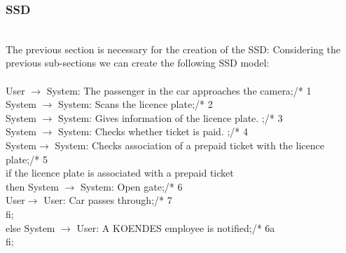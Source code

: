 \subsubsection{SSD}
\creator{\studentB}
\\
The previous section is necessary for the creation of the SSD: Considering the previous sub-sections we can create the following SSD model:\\\\
User $\rightarrow$ System: The passenger in the car approaches the camera;\hfill /* 1\\
System $\rightarrow$ System: Scans the licence plate;\hfill /* 2\\
System $\rightarrow$ System: Gives information of the licence plate.
;\hfill /* 3\\
System $\rightarrow$ System: Checks whether ticket is paid.
;\hfill /* 4\\
System$\rightarrow$ System: Checks association of a prepaid ticket with the licence plate;\hfill /* 5\\
if the licence plate is associated with a prepaid ticket\\
then System $\rightarrow$ System: Open gate;\hfill /* 6\\
\phantom{x}\hspace{2ex}User$\rightarrow$ User: Car passes through;\hfill /* 7\\
\phantom{x}\hspace{2ex}fi;\\
else System $\rightarrow$ User: A KOENDES employee is notified;\hfill /* 6a\\
fi;\\

\newpage
